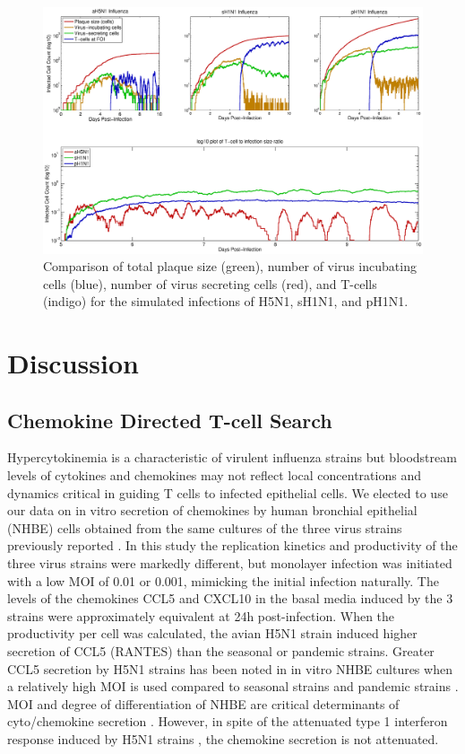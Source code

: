 \documentclass[10pt]{article}
\begin{document}
\begin{figure}[ht!]
\begin{center}
 \includegraphics[width=\textwidth]{plaquesize}
 \end{center}
\caption{Comparison of total plaque size (green), number of virus incubating cells (blue), number of virus secreting cells (red), and T-cells (indigo) for the simulated infections of H5N1, sH1N1, and pH1N1.} 
 \label{fig:plaquesize}
\end{figure}


\section*{Discussion}


\subsection*{Chemokine Directed T-cell Search}

Hypercytokinemia is a characteristic of virulent influenza strains \cite{DeJong2006} but bloodstream levels of cytokines and chemokines may not reflect local concentrations and dynamics critical in guiding T cells to infected epithelial cells.  We elected to use our data on in vitro secretion of chemokines by human bronchial epithelial (NHBE) cells obtained from the same cultures of the three virus strains previously reported \cite{Mitchell2011}.  In this study the replication kinetics and productivity of the three virus strains were markedly different, but monolayer infection was initiated with a low MOI of 0.01 or 0.001, mimicking the initial infection naturally.  The levels of the chemokines CCL5 and CXCL10 in the basal media induced by the 3 strains were approximately equivalent at 24h post-infection.  When the productivity per cell was calculated, the avian H5N1 strain induced higher secretion of CCL5 (RANTES) than the seasonal or pandemic strains.  Greater CCL5 secretion by H5N1 strains has been noted in in vitro NHBE cultures when a relatively high MOI is used compared to seasonal strains \cite{Chan2005, Chan2010, Zeng2011} and pandemic strains \cite{Zeng2011}.  MOI and degree of differentiation of NHBE are critical determinants of cyto/chemokine secretion \cite{Chan2010}.  However, in spite of the attenuated type 1 interferon response induced by H5N1 strains \cite{Zeng2007}, the chemokine secretion is not attenuated.
\end{document}
